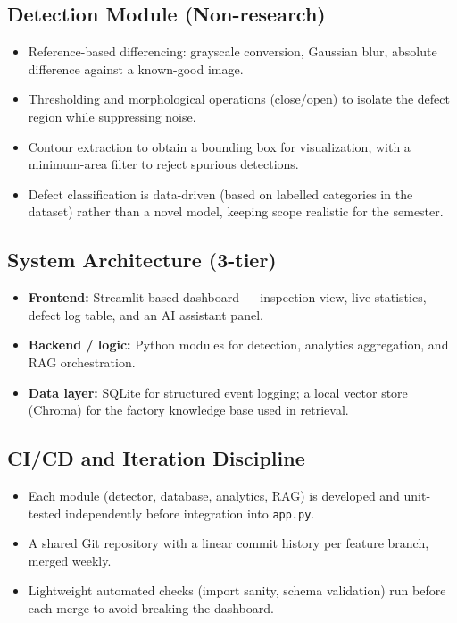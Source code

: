 \documentclass[11pt]{article}
\begin{document}
\subsection{Detection Module (Non-research)}
\begin{itemize}[leftmargin=*]
    \item Reference-based differencing: grayscale conversion, Gaussian blur, absolute difference
    against a known-good image.
    \item Thresholding and morphological operations (close/open) to isolate the defect region while
    suppressing noise.
    \item Contour extraction to obtain a bounding box for visualization, with a minimum-area filter
    to reject spurious detections.
    \item Defect classification is data-driven (based on labelled categories in the dataset) rather
    than a novel model, keeping scope realistic for the semester.
\end{itemize}

\subsection{System Architecture (3-tier)}
\begin{itemize}[leftmargin=*]
    \item \textbf{Frontend:} Streamlit-based dashboard --- inspection view, live statistics, defect
    log table, and an AI assistant panel.
    \item \textbf{Backend / logic:} Python modules for detection, analytics aggregation, and RAG
    orchestration.
    \item \textbf{Data layer:} SQLite for structured event logging; a local vector store (Chroma)
    for the factory knowledge base used in retrieval.
\end{itemize}

\subsection{CI/CD and Iteration Discipline}
\begin{itemize}[leftmargin=*]
    \item Each module (detector, database, analytics, RAG) is developed and unit-tested independently
    before integration into \texttt{app.py}.
    \item A shared Git repository with a linear commit history per feature branch, merged weekly.
    \item Lightweight automated checks (import sanity, schema validation) run before each merge to
    avoid breaking the dashboard.
\end{itemize}
\end{document}
